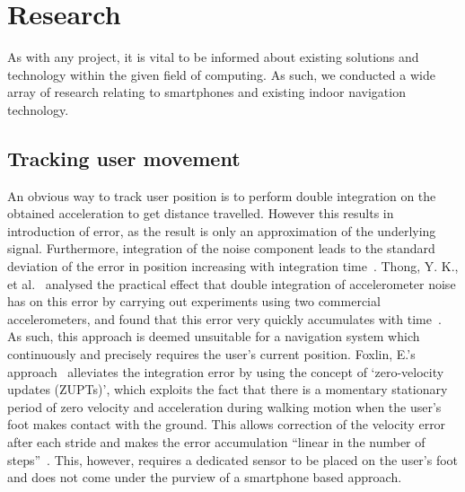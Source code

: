 \documentclass[main.tex]{subfiles}
\begin{document}
\chapter{Research}

As with any project, it is vital to be informed about existing solutions and technology within the given field of computing. As such, we conducted a wide array of research relating to smartphones and existing indoor navigation technology.


 \section{Tracking user movement}

An obvious way to track user position is to perform double integration on the obtained acceleration to get distance travelled. However this results in introduction of error, as the result is only an approximation of the underlying signal. Furthermore, integration of the noise component leads to the standard deviation of the error in position increasing with integration time~\cite[p.73]{integrationError}. Thong, Y. K., et al.~\cite{integrationErrorPractical} analysed the practical effect that double integration of accelerometer noise has on this error by carrying out experiments using two commercial accelerometers, and found that this error very quickly accumulates with time~\cite[p.1168]{integrationErrorPractical}. As such, this approach is deemed unsuitable for a navigation system which continuously and precisely requires the user’s current position. Foxlin, E.'s approach~\cite{foxlin2005pedestrian} alleviates the integration error by using the concept of `zero-velocity updates (ZUPTs)’, which exploits the fact that there is a momentary stationary period of zero velocity and acceleration during walking motion when the user’s foot makes contact with the ground. This allows correction of the velocity error after each stride and makes the error accumulation ``linear in the number of steps''~\cite[p.38]{foxlin2005pedestrian}. This, however, requires a dedicated sensor to be placed on the user’s foot and does not come under the purview of a smartphone based approach. 
\end{document}
